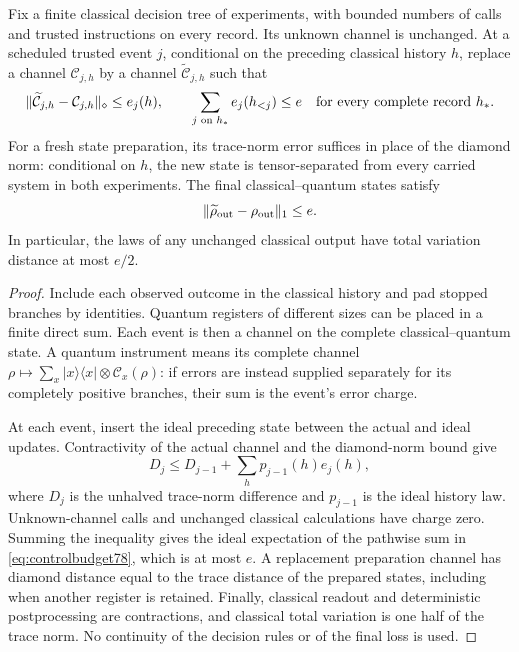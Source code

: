 \begin{lemma}
\label{lem:controlhybrid78}
Fix a finite classical decision tree of experiments, with bounded
numbers of calls and trusted instructions on every record.  Its
unknown channel is unchanged.  At a scheduled trusted event $j$,
conditional on the preceding classical history $h$, replace a
channel $\mathcal C_{j,h}$ by a channel $\widetilde{\mathcal C}_{j,h}$
such that
\begin{equation}\label{eq:controlbudget78}
 \|\widetilde{\mathcal C}_{j,h}-\mathcal C_{j,h}\|_\diamond
 \le e_j(h),\qquad
 \sum_{j\text{ on }h_*}e_j(h_{<j})\le e
 \quad\hbox{for every complete record }h_*.
\end{equation}
For a fresh state preparation, its trace-norm error suffices in
place of the diamond norm: conditional on $h$, the new state is
tensor-separated from every carried system in both experiments.
The final classical--quantum states
satisfy
\begin{equation}\label{eq:controlhybrid78}
 \|\widetilde\rho_{\rm out}-\rho_{\rm out}\|_1\le e.
\end{equation}
In particular, the laws of any unchanged classical output have
total variation distance at most $e/2$.
\end{lemma}
\begin{proof}
Include each observed outcome in the classical history and pad
stopped branches by identities.  Quantum registers of different
sizes can be placed in a finite direct sum.  Each event is then a
channel on the complete classical--quantum state.  A quantum
instrument means its complete channel
$\rho\mapsto\sum_x|x\rangle\langle x|\otimes\mathcal C_x(\rho)$:
if errors are instead supplied separately for its completely
positive branches, their sum is the event's error charge.

At each event, insert the ideal preceding state between the actual
and ideal updates.  Contractivity of the actual channel and the
diamond-norm bound give
\[
 D_j\le D_{j-1}
       +\sum_h p_{j-1}(h)e_j(h),
\]
where $D_j$ is the unhalved trace-norm difference and $p_{j-1}$ is
the ideal history law.  Unknown-channel calls and unchanged
classical calculations have charge zero.  Summing the inequality
gives the ideal expectation of the pathwise sum in
\eqref{eq:controlbudget78}, which is at most $e$.
A replacement preparation channel has diamond distance equal to
the trace distance of the prepared states, including when another
register is retained.  Finally, classical readout and deterministic
postprocessing are contractions, and classical total variation is
one half of the trace norm.  No continuity of the decision rules
or of the final loss is used.
\end{proof}

